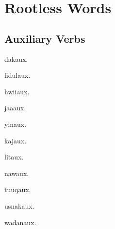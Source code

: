 \chapter{Rootless Words}
\begin{multicols*}{2}
\section{Auxiliary Verbs}
\begin{description}[leftmargin=*]
    \begin{dictentry}{dak}{aux.}
    \end{dictentry}
    \begin{dictentry}{fidul}{aux.}
    \end{dictentry}
    \begin{dictentry}{hwii}{aux.}
    \end{dictentry}
    \begin{dictentry}{jaa}{aux.}
    \end{dictentry}
    \begin{dictentry}{yin}{aux.}
    \end{dictentry}
    \begin{dictentry}{kaj}{aux.}
    \end{dictentry}
    \begin{dictentry}{lit}{aux.}
    \end{dictentry}
    \begin{dictentry}{naw}{aux.}
    \end{dictentry}
    \begin{dictentry}{tuuq}{aux.}
    \end{dictentry}
    \begin{dictentry}{usnak}{aux.}
    \end{dictentry}
    \begin{dictentry}{wadan}{aux.}
    \end{dictentry}
\end{description}


\end{multicols*}
